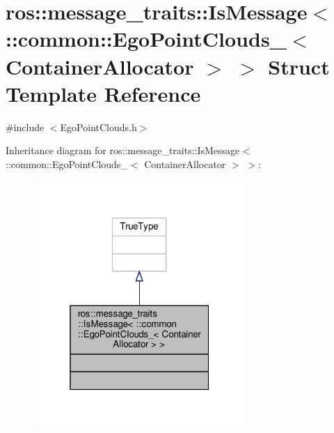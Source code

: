\hypertarget{structros_1_1message__traits_1_1IsMessage_3_01_1_1common_1_1EgoPointClouds___3_01ContainerAllocator_01_4_01_4}{}\section{ros\+:\+:message\+\_\+traits\+:\+:Is\+Message$<$ \+:\+:common\+:\+:Ego\+Point\+Clouds\+\_\+$<$ Container\+Allocator $>$ $>$ Struct Template Reference}
\label{structros_1_1message__traits_1_1IsMessage_3_01_1_1common_1_1EgoPointClouds___3_01ContainerAllocator_01_4_01_4}


{\ttfamily \#include $<$Ego\+Point\+Clouds.\+h$>$}



Inheritance diagram for ros\+:\+:message\+\_\+traits\+:\+:Is\+Message$<$ \+:\+:common\+:\+:Ego\+Point\+Clouds\+\_\+$<$ Container\+Allocator $>$ $>$\+:\nopagebreak
\begin{figure}[H]
\begin{center}
\leavevmode
\includegraphics[width=229pt]{d5/d8b/structros_1_1message__traits_1_1IsMessage_3_01_1_1common_1_1EgoPointClouds___3_01ContainerAllocator_01_4_01_4__inherit__graph}
\end{center}
\end{figure}


